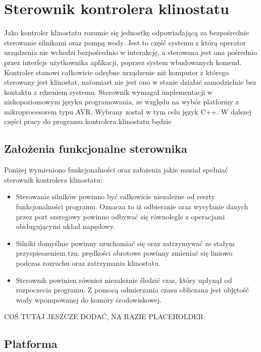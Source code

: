 \chapter{Sterownik kontrolera klinostatu}

Jako kontroler klinostatu rozumie się jednostkę odpowiadającą za bezpośrednie sterowanie silnikami oraz pompą wody. Jest to część systemu z którą operator urządzenia nie wchodzi bezpośrednio w interakcję, a sterowana jest ona pośrednio przez interfejs użytkownika aplikacji, poprzez system wbudowanych komend. Kontroler stanowi całkowicie odrębne urządzenie niż komputer z którego sterowany jest klinostat, natomiast nie jest ono w stanie działać samodzielnie bez kontaktu z rdzeniem systemu. Sterownik wymagał implementacji w niskopoziomowym języku programowania, ze względu na wybór platformy z mikroprocesorem typu AVR. Wybrany został w tym celu język C++. W dalszej części pracy do programu kontrolera klinostatu będzie 
\section{Założenia funkcjonalne sterownika}

Poniżej wymieniono funkcjonalności oraz założenia jakie musiał spełniać sterownik kontrolera klinostatu:

\begin{itemize}
	
	\item Sterowanie silników powinno być całkowicie niezależne od reszty funkcjonalności programu. Oznacza to iż odbieranie oraz wysyłanie danych przez port szeregowy powinno odbywać się równolegle z operacjami obsługującymi układ napędowy.
	\item Silniki domyślnie powinny uruchamiać się oraz zatrzymywać ze stałym przyspieszeniem tzn. prędkości obrotowe powinny zmieniać się liniowo podczas rozruchu oraz zatrzymania klinostatu.
	\item Sterownik powinien również niezależnie śledzić czas, który upłynął od rozpoczecia programu. Z pomocą odmierzania czasu obliczana jest objętość wody wpompowanej do komory środowiskowej.

\end{itemize}

COŚ TUTAJ JESZCZE DODAĆ, NA RAZIE PLACEHOLDER.


\section{Platforma}

